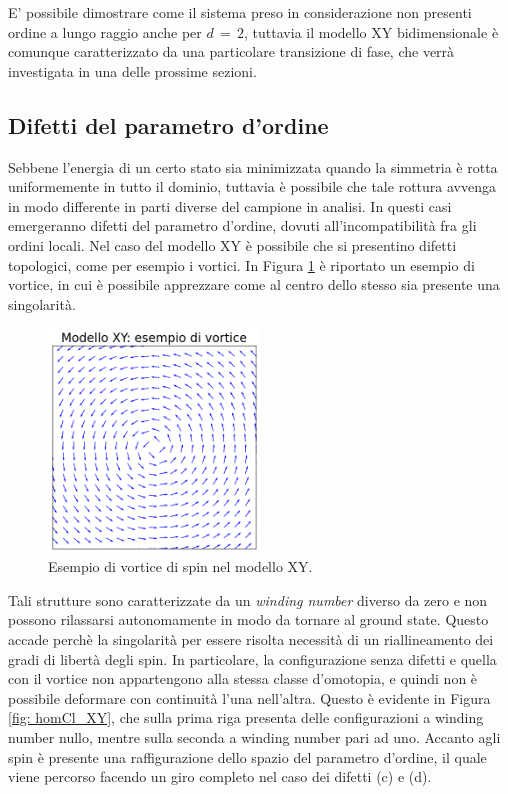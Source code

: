 E' possibile dimostrare come il sistema preso in considerazione non presenti ordine a lungo raggio anche per $d\,=\,2$, tuttavia il 
modello XY bidimensionale è comunque caratterizzato da una particolare transizione di fase, che verrà investigata in una delle 
prossime sezioni. 





\subsection{Difetti del parametro d'ordine}

Sebbene l'energia di un certo stato sia minimizzata quando la simmetria è rotta uniformemente in tutto il dominio, tuttavia è possibile 
che tale rottura avvenga in modo differente in parti diverse del campione in analisi. In questi casi emergeranno difetti del parametro d'ordine, 
dovuti all'incompatibilità fra gli ordini locali. Nel caso del modello XY è possibile che si presentino difetti topologici, come per esempio 
i vortici. In Figura \ref{fig: vort_XY} è riportato un esempio di vortice, in cui è possibile apprezzare come al centro dello stesso sia 
presente una singolarità.

\begin{figure}[H]
    \centering
    \includegraphics[width=0.5\textwidth]{Immagini/vort_XY.png}
    \caption{Esempio di vortice di spin nel modello XY.}
    \label{fig: vort_XY}
\end{figure}

Tali strutture sono caratterizzate da un \textit{winding number} diverso da zero e non possono rilassarsi autonomamente in modo 
da tornare al ground state. Questo accade perchè la singolarità per essere risolta necessità di un riallineamento dei gradi di libertà 
degli spin. In particolare, la configurazione senza difetti e quella con il vortice non appartengono alla stessa classe d'omotopia, 
e quindi non è possibile deformare con continuità l'una nell'altra. Questo è evidente in Figura \ref{fig: homCl_XY}, 
che sulla prima riga presenta delle configurazioni a winding number nullo, mentre sulla seconda a winding number pari ad uno. Accanto agli spin è 
presente una raffigurazione dello spazio del parametro d'ordine, il quale viene percorso facendo un giro completo nel caso dei difetti (c) e (d). 

